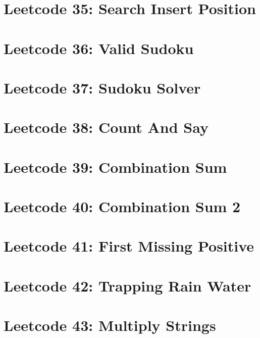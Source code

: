 \documentclass{article}
\begin{document}
\section*{Leetcode 35: Search Insert Position}

\pagebreak 

\section*{Leetcode 36: Valid Sudoku}

\pagebreak 

\section*{Leetcode 37: Sudoku Solver}

\pagebreak 

\section*{Leetcode 38: Count And Say}

\pagebreak 

\section*{Leetcode 39: Combination Sum}

\pagebreak 

\section*{Leetcode 40: Combination Sum 2}

\pagebreak 

\section*{Leetcode 41: First Missing Positive}

\pagebreak 

\section*{Leetcode 42: Trapping Rain Water}

\pagebreak 

\section*{Leetcode 43: Multiply Strings}

\pagebreak 
\end{document}
